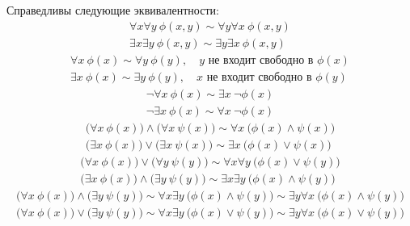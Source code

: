 \begin{theorem}
    Справедливы следующие эквивалентности:
    \[
        \begin{array}{l}
            \forall x \forall y \ \phi(x,y) \sim \forall y \forall x \ \phi(x,y) \\
            \exists x \exists y \ \phi(x,y) \sim \exists y \exists x \ \phi(x,y)
        \end{array}
    \]
    \[
        \begin{array}{l}
            \forall x \ \phi(x) \sim \forall y \ \phi(y), \quad y\text{ не входит свободно в }\phi(x) \\
            \exists x \ \phi(x) \sim \exists y \ \phi(y), \quad x\text{ не входит свободно в }\phi(y)
        \end{array}
    \]
    \[
        \begin{array}{l}
            \lnot \forall x \ \phi(x) \sim \exists x \ \lnot \phi(x) \\
            \lnot \exists x \ \phi(x) \sim \forall x \ \lnot \phi(x)
        \end{array}
    \]
    \[
        \begin{array}{l}
            \big(\forall x \ \phi(x)\big) \land \big(\forall x \ \psi(x)\big) \sim \forall x \ \big(\phi(x)\land \psi(x)\big) \\
            \big(\exists x \ \phi(x)\big) \lor \big(\exists x \ \psi(x)\big) \sim \exists x \ \big(\phi(x)\lor \psi(x)\big)
        \end{array}
    \]
    \[
        \begin{array}{l}
            \big(\forall x \ \phi(x)\big) \lor \big(\forall y \ \psi(y)\big) \sim \forall x \forall y \ \big(\phi(x)\lor \psi(y)\big) \\
            \big(\exists x \ \phi(x)\big) \land \big(\exists y \ \psi(y)\big) \sim \exists x \exists y \ \big(\phi(x)\land \psi(y)\big)
        \end{array}
    \]
    \[
        \begin{array}{l}
            \big(\forall x \ \phi(x)\big) \land \big(\exists y \ \psi(y)\big) \sim \forall x \exists y \ \big(\phi(x) \land \psi(y)\big) \sim \exists y \forall x \ \big(\phi(x) \land \psi(y)\big) \\
            \big(\forall x \ \phi(x)\big) \lor \big(\exists y \ \psi(y)\big) \sim \forall x \exists y \ \big(\phi(x) \lor \psi(y)\big) \sim \exists y \forall x \ \big(\phi(x) \lor \psi(y)\big)
        \end{array}
\]
\end{theorem}
